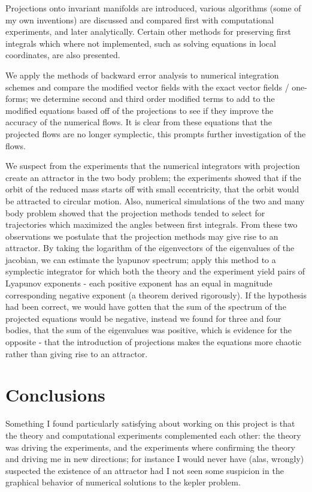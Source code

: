 \documentclass[12pt]{article}
\begin{document}
Projections onto invariant manifolds are introduced, various algorithms (some of my own inventions) are discussed and compared first with computational experiments, and later analytically. Certain other methods for preserving first integrals which where not implemented, such as solving equations in local coordinates, are also presented. 

We apply the methods of backward error analysis to numerical integration schemes and compare the modified vector fields with the exact vector fields / one-forms; we determine second and third order modified terms to add to the modified equations based off of the projections to see if they improve the accuracy of the numerical flows. It is clear from these equations that the projected flows are no longer symplectic, this prompts further investigation of the flows.

We suspect from the experiments that the numerical integrators with projection create an attractor in the two body problem; the experiments showed that if the orbit of the reduced mass starts off with small eccentricity, that the orbit would be attracted to circular motion. Also, numerical simulations of the two and many body problem showed that the projection methods tended to select for trajectories which maximized the angles between first integrals. From these two observations we postulate that the projection methods may give rise to an attractor. By taking the logarithm of the eigenvectors of the eigenvalues of the jacobian, we can estimate the lyapunov spectrum; apply this method to a symplectic integrator for which both the theory and the experiment yield pairs of Lyapunov exponents - each positive exponent has an equal in magnitude corresponding negative exponent (a theorem derived rigorously). If the hypothesis had been correct, we would have gotten that the sum of the spectrum of the projected equations would be negative, instead we found for three and four bodies, that the sum of the eigenvalues was positive, which is evidence for the opposite - that the introduction of projections makes the equations more chaotic rather than giving rise to an attractor. 


\section{Conclusions}
Something I found particularly satisfying about working on this project is that the theory and computational experiments complemented each other: the theory was driving the experiments, and the experiments where confirming the theory and driving me in new directions; for instance I would never have (alas, wrongly) suspected the existence of an attractor had I not seen some suspicion in the graphical behavior of numerical solutions to the kepler problem.
\end{document}
